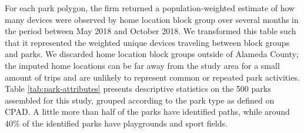 \documentclass[3p, authoryear, review]{elsarticle} %
\begin{document}
For each park polygon, the firm returned a population-weighted estimate of how many devices were observed by home location block group over several months in the period between May 2018 and October 2018. We transformed this table such that it represented the weighted unique devices traveling between block groups and parks. We discarded home location block groups outside of Alameda County; the imputed home locations can be far away from the study area for a small amount of trips and are unlikely to represent common or repeated park activities. Table \ref{tab:park-attributes} presents descriptive statistics on the 500 parks assembled for this study, grouped according to the park type as defined on CPAD. A little more than half of the parks have identified paths, while around 40\% of the identified parks have playgrounds and sport fields.
\end{document}
